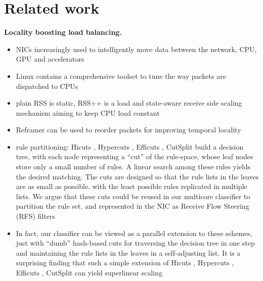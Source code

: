 \section{Related work}
\label{sec:related-work}

\noindent%
\textbf{Locality boosting load balancing.} %
\begin{itemize}
\item NICs increasingly used to intelligently move data between the network, CPU, GPU and accelerators \cite{sherry-ccr23}
\item Linux contains a comprehensive toolset to tune the way packets are dispatched to CPUs \cite{rss-linux}
\item plain RSS is static, RSS++ is a load and state-aware receive side scaling mechanism aiming to keep CPU load constant \cite{10.1145/3359989.3365412}
\item Reframer can be used to reorder packets for improving temporal locality \cite{276946,246322}
\item rule partitioning: Hicuts \cite{820051}, Hypercuts \cite{10.1145/863955.863980}, Efficuts \cite{10.1145/1851182.1851208}, CutSplit \cite{8485947} build a decision tree, with each node representing a ``cut'' of the rule-space, whose leaf nodes store only a small number of rules. A linear search among these rules yields the desired matching. The cuts are designed so that the rule lists in the leaves are as small as possible, with the least possible rules replicated in multiple lists. We argue that these cuts could be reused in our multicore classifier to partition the rule set, and represented in the NIC as Receive Flow Steering (RFS) filters
\item In fact, our classifier can be viewed as a parallel extension to these schemes, just with ``dumb'' hash-based cuts for traversing the decision tree in one step and maintaining the rule lists in the leaves in a self-adjusting list. It is a surprising finding that such a simple extension of Hicuts \cite{820051}, Hypercuts \cite{10.1145/863955.863980}, Efficuts \cite{10.1145/1851182.1851208}, CutSplit \cite{8485947} can yield superlinear scaling
\end{itemize}


